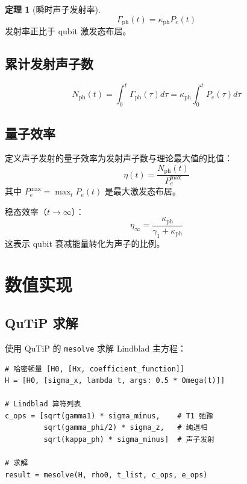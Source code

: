 \documentclass[12pt,a4paper]{article}
\theoremstyle{definition}
\newtheorem{theorem}{定理}[section]
\begin{document}
\begin{theorem}[瞬时声子发射率]
\begin{equation}
    \boxed{\Gamma_{\text{ph}}(t) = \kappa_{\text{ph}} P_e(t)}
\end{equation}
发射率正比于 qubit 激发态布居。
\end{theorem}

\subsection{累计发射声子数}

\begin{equation}
    N_{\text{ph}}(t) = \int_0^t \Gamma_{\text{ph}}(\tau) d\tau = \kappa_{\text{ph}}\int_0^t P_e(\tau) d\tau
    \label{eq:cumulative_phonons}
\end{equation}

\subsection{量子效率}

定义声子发射的量子效率为发射声子数与理论最大值的比值：
\begin{equation}
    \boxed{\eta(t) = \frac{N_{\text{ph}}(t)}{P_e^{\text{max}}}}
    \label{eq:quantum_efficiency}
\end{equation}
其中 $P_e^{\text{max}} = \max_t P_e(t)$ 是最大激发态布居。

稳态效率（$t \to \infty$）：
\begin{equation}
    \eta_{\infty} = \frac{\kappa_{\text{ph}}}{\gamma_1 + \kappa_{\text{ph}}}
    \label{eq:steady_efficiency}
\end{equation}
这表示 qubit 衰减能量转化为声子的比例。

\section{数值实现}

\subsection{QuTiP 求解}

使用 QuTiP 的 \texttt{mesolve} 求解 Lindblad 主方程：

\begin{lstlisting}
# 哈密顿量 [H0, [Hx, coefficient_function]]
H = [H0, [sigma_x, lambda t, args: 0.5 * Omega(t)]]

# Lindblad 算符列表
c_ops = [sqrt(gamma1) * sigma_minus,    # T1 弛豫
         sqrt(gamma_phi/2) * sigma_z,   # 纯退相
         sqrt(kappa_ph) * sigma_minus]  # 声子发射

# 求解
result = mesolve(H, rho0, t_list, c_ops, e_ops)
\end{lstlisting}
\end{document}
